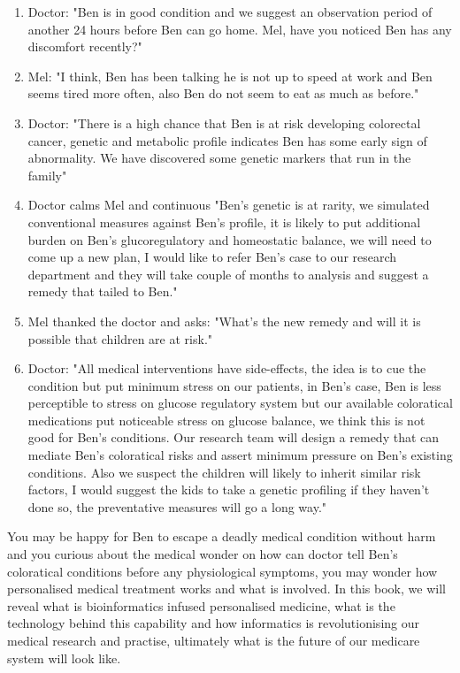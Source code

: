\begin{enumerate}
    \item Doctor: "Ben is in good condition and we suggest an observation period of another 24 hours before Ben can go home. Mel, have you noticed Ben has any discomfort recently?" \\
    \item Mel: "I think, Ben has been talking he is not up to speed at work and Ben seems tired more often, also Ben do not seem to eat as much as before." \\
    \item Doctor: "There is a high chance that Ben is at risk developing colorectal cancer, genetic and metabolic profile indicates Ben has some early sign of abnormality. We have discovered some genetic markers that run in the family" \\
    \item Doctor calms Mel and continuous "Ben's genetic is at rarity, we simulated conventional measures against Ben's profile, it is likely to put additional burden on Ben's glucoregulatory and homeostatic balance, we will need to come up a new plan, I would like to refer Ben's case to our research department and they will take couple of months to analysis and suggest a remedy that tailed to Ben." \\
    \item Mel thanked the doctor and asks: "What's the new remedy and will it is possible that children are at risk." \\
    \item Doctor: "All medical interventions have side-effects, the idea is to cue the condition but put minimum stress on our patients, in Ben's case, Ben is less perceptible to stress on glucose regulatory system but our available coloratical medications put noticeable stress on glucose balance, we think this is not good for Ben's conditions. Our research team will design a remedy that can mediate Ben's coloratical risks and assert minimum pressure on Ben's existing conditions. Also we suspect the children will likely to inherit similar risk factors, I would suggest the kids to take a genetic profiling if they haven't done so, the preventative measures will go a long way." \\
\end{enumerate}

You may be happy for Ben to escape a deadly medical condition without harm and you curious about the medical wonder on how can doctor tell Ben's coloratical conditions before any physiological symptoms, you may wonder how personalised medical treatment works and what is involved. In this book, we will reveal what is bioinformatics infused personalised medicine, what is the technology behind this capability and how informatics is revolutionising our medical research and practise, ultimately what is the future of our medicare system will look like.